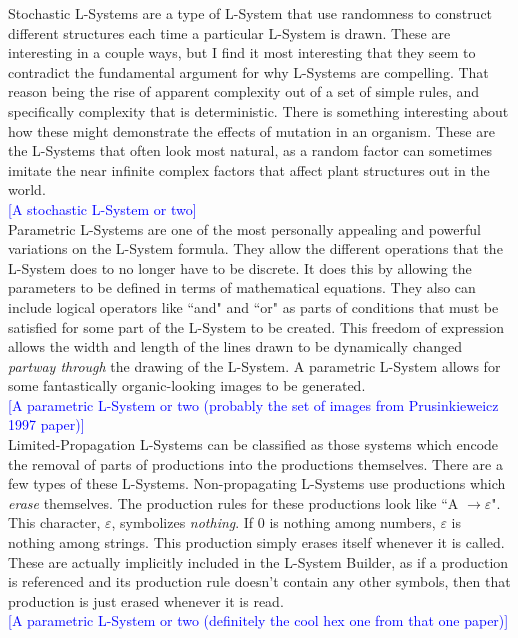 \documentclass[12pt,twoside]{reedthesis}
\begin{document}
	Stochastic L-Systems are a type of L-System that use randomness to construct different structures each time a particular L-System is drawn. These are interesting in a couple ways, but I find it most interesting that they seem to contradict the fundamental argument for why L-Systems are compelling. That reason being the rise of apparent complexity out of a set of simple rules, and specifically complexity that is deterministic. There is something interesting about how these might demonstrate the effects of mutation in an organism. These are the L-Systems that often look most natural, as a random factor can sometimes imitate the near infinite complex factors that affect plant structures out in the world.\\
	\textcolor{blue}{[A stochastic L-System or two]}\\
	
	Parametric L-Systems are one of the most personally appealing and powerful variations on the L-System formula. They allow the different operations that the L-System does to no longer have to be discrete. It does this by allowing the parameters to be defined in terms of mathematical equations. They also can include logical operators like ``and" and ``or" as parts of conditions that must be satisfied for some part of the L-System to be created. This freedom of expression allows the width and length of the lines drawn to be dynamically changed \textit{partway through} the drawing of the L-System. A parametric L-System allows for some fantastically organic-looking images to be generated.\\
	\textcolor{blue}{[A parametric L-System or two (probably the set of images from Prusinkieweicz 1997 paper)]}\\
	
	Limited-Propagation L-Systems can be classified as those systems which encode the removal of parts of productions into the productions themselves. There are a few types of these L-Systems. Non-propagating L-Systems use productions which \textit{erase} themselves. The production rules for these productions look like ``A $\rightarrow \varepsilon$". This character, $\varepsilon$, symbolizes \textit{nothing}. If 0 is nothing among numbers, $\varepsilon$ is nothing among strings. This production simply erases itself whenever it is called. These are actually implicitly included in the L-System Builder, as if a production is referenced and its production rule doesn't contain any other symbols, then that production is just erased whenever it is read.\\
	\textcolor{blue}{[A parametric L-System or two (definitely the cool hex one from that one paper)]}\\
	
\end{document}
